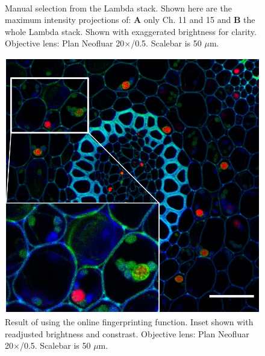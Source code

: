 \begin{figure}[h!]
\centering
\captionsetup[subfigure]{position=bottom}
\hspace{0.1mm}
\\
\caption{Manual selection from the Lambda stack. 
Shown here are the maximum intensity projections of: \textbf{A} only Ch. 11 and 15 and \textbf{B} the whole Lambda stack. 
Shown with exaggerated brightness for clarity.  
Objective lens: Plan Neofluar 20$\times$/0.5. 
Scalebar is 50 $\mu$m.} 
\label{fig:manlinun}
\end{figure}

\begin{figure}[h!]
\centering
\includegraphics[width=.5\columnwidth]{Exp_3_LSM/Figures/MS3/F2_olfp5_50um}
\caption{Result of using the online fingerprinting function. 
Inset shown with readjusted brightness and constrast. 
Objective lens: Plan Neofluar 20$\times$/0.5. 
Scalebar is 50 $\mu$m.}
\label{fig:olfp}
\end{figure}

